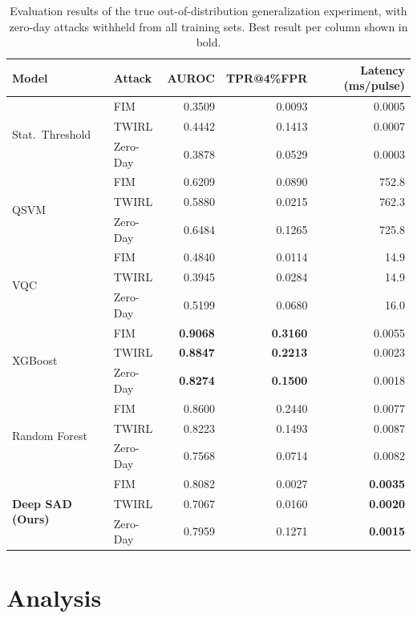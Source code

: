 \documentclass[12pt, a4paper]{report}
\begin{document}
\begin{table}[h]
\centering
\caption{Evaluation results of the true out-of-distribution generalization experiment, with zero-day attacks withheld from all training sets. Best result per column shown in bold.}
\label{tab:ood_results}
\begin{tabular}{@{}llrrr@{}}
\toprule
\textbf{Model} & \textbf{Attack} & \textbf{AUROC} & \textbf{TPR@4\%FPR} & \textbf{Latency (ms/pulse)} \\
\midrule
\multirow{3}{*}{Stat.\ Threshold}
    & FIM      & 0.3509 & 0.0093 & 0.0005 \\
    & TWIRL    & 0.4442 & 0.1413 & 0.0007 \\
    & Zero-Day & 0.3878 & 0.0529 & 0.0003 \\
\midrule
\multirow{3}{*}{QSVM}
    & FIM      & 0.6209 & 0.0890 & 752.8 \\
    & TWIRL    & 0.5880 & 0.0215 & 762.3 \\
    & Zero-Day & 0.6484 & 0.1265 & 725.8 \\
\midrule
\multirow{3}{*}{VQC}
    & FIM      & 0.4840 & 0.0114 & 14.9 \\
    & TWIRL    & 0.3945 & 0.0284 & 14.9 \\
    & Zero-Day & 0.5199 & 0.0680 & 16.0 \\
\midrule
\multirow{3}{*}{XGBoost}
    & FIM      & \textbf{0.9068} & \textbf{0.3160} & 0.0055 \\
    & TWIRL    & \textbf{0.8847} & \textbf{0.2213} & 0.0023 \\
    & Zero-Day & \textbf{0.8274} & \textbf{0.1500} & 0.0018 \\
\midrule
\multirow{3}{*}{Random Forest}
    & FIM      & 0.8600 & 0.2440 & 0.0077 \\
    & TWIRL    & 0.8223 & 0.1493 & 0.0087 \\
    & Zero-Day & 0.7568 & 0.0714 & 0.0082 \\
\midrule
\multirow{3}{*}{\textbf{Deep SAD (Ours)}}
    & FIM      & 0.8082 & 0.0027 & \textbf{0.0035} \\
    & TWIRL    & 0.7067 & 0.0160 & \textbf{0.0020} \\
    & Zero-Day & 0.7959 & 0.1271 & \textbf{0.0015} \\
\bottomrule
\end{tabular}
\end{table}

\section{Analysis}\label{sec:ood_analysis}
\end{document}
